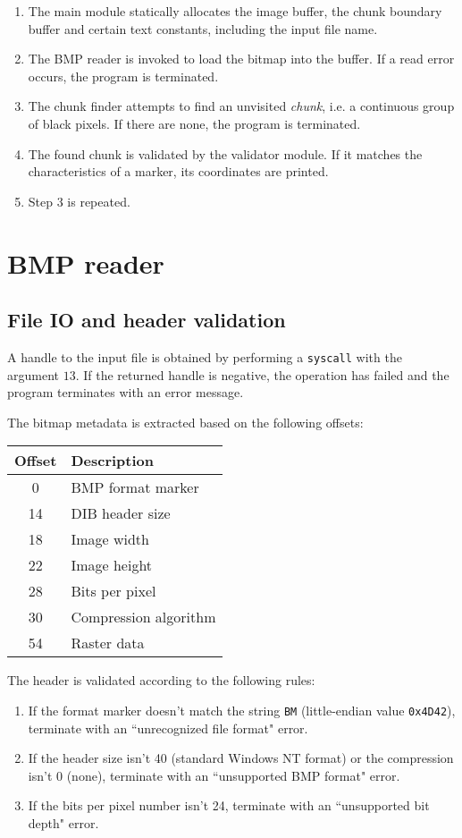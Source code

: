 \documentclass{article}
\begin{document}
	\begin{enumerate}
		\item The main module statically allocates the image buffer, the chunk
		boundary buffer and certain text constants, including the input
		file name.
		\item The BMP reader is invoked to load the bitmap into the buffer. If a
		read error occurs, the program is terminated.
		\item The chunk finder attempts to find an unvisited \textit{chunk},
		i.e. a continuous group of black pixels. If there are none, the program
		is terminated.
		\item The found chunk is validated by the validator module. If it
		matches the characteristics of a marker, its coordinates are printed.
		\item Step 3 is repeated.
	\end{enumerate}
	
	\section{BMP reader}
	
	\subsection{File IO and header validation}
	
	A handle to the input file is obtained by performing a \texttt{syscall} with
	the argument $13$. If the returned handle is negative, the operation has
	failed and the program terminates with an error message.
	
	The bitmap metadata is extracted based on the following offsets:
	\begin{center}
		\begin{tabular}{|c|l|}
			\hline
			Offset & Description \\
			\hline
			0 & BMP format marker\\
			14 & DIB header size \\
			18 & Image width \\
			22 & Image height \\
			28 & Bits per pixel \\
			30 & Compression algorithm \\
			54 & Raster data \\
			\hline
		\end{tabular}
	\end{center}
	The header is validated according to the following rules:
	\begin{enumerate}
		\item If the format marker doesn't match the string \texttt{BM}
		(little-endian value \texttt{0x4D42}), terminate with an ``unrecognized
		file format" error.
		\item If the header size isn't 40 (standard Windows NT format) or the
		compression isn't 0 (none), terminate with an ``unsupported BMP format"
		error.
		\item If the bits per pixel number isn't 24, terminate with an
		``unsupported bit depth" error.
	\end{enumerate}
	
\end{document}
